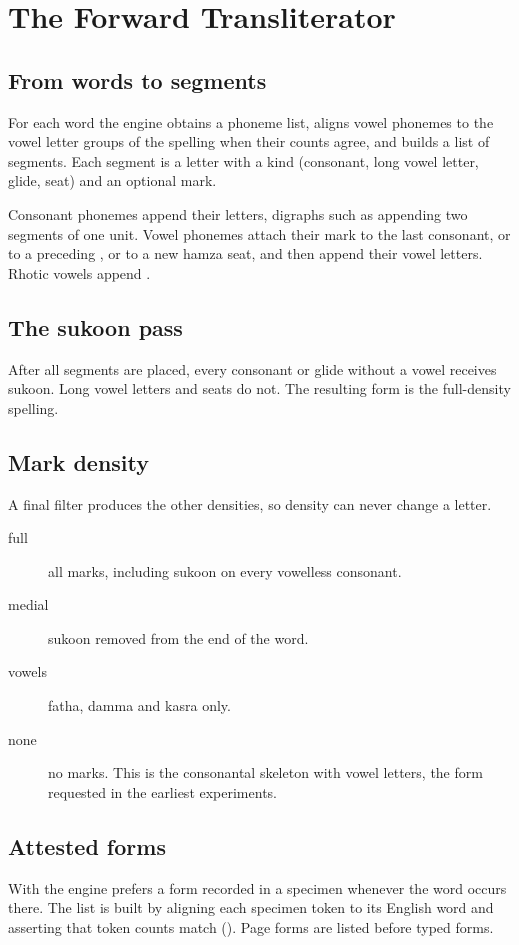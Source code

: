 \chapter{The Forward Transliterator}

\section{From words to segments}
For each word the engine obtains a phoneme list, aligns vowel phonemes to the vowel letter groups of the spelling when their counts agree, and builds a list of segments. Each segment is a letter with a kind (consonant, long vowel letter, glide, seat) and an optional mark.

Consonant phonemes append their letters, digraphs such as  appending two segments of one unit. Vowel phonemes attach their mark to the last consonant, or to a preceding , or to a new hamza seat, and then append their vowel letters. Rhotic vowels append .

\section{The sukoon pass}
After all segments are placed, every consonant or glide without a vowel receives sukoon. Long vowel letters and seats do not. The resulting form is the full-density spelling.

\section{Mark density}
A final filter produces the other densities, so density can never change a letter.
\begin{description}
\item[full] all marks, including sukoon on every vowelless consonant.
\item[medial] sukoon removed from the end of the word.
\item[vowels] fatha, damma and kasra only.
\item[none] no marks. This is the consonantal skeleton with vowel letters, the form requested in the earliest experiments.
\end{description}

\section{Attested forms}
With  the engine prefers a form recorded in a specimen whenever the word occurs there. The list is built by aligning each specimen token to its English word and asserting that token counts match (). Page forms are listed before typed forms.

